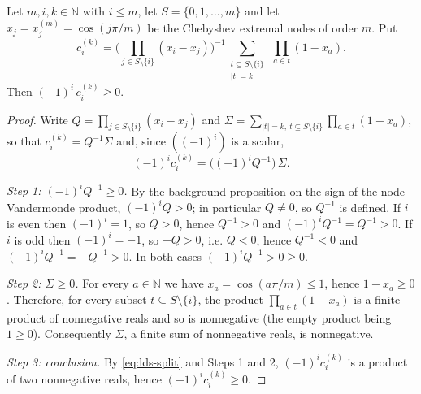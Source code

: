 \begin{lemma}
Let $m,i,k\in\mathbb{N}$ with $i\le m$, let $S=\{0,1,\dots,m\}$ and let
$x_j=x^{(m)}_j=\cos(j\pi/m)$ be the Chebyshev extremal nodes of order $m$. Put
\[
  c_i^{(k)}=\Biggl(\prod_{j\in S\setminus\{i\}}(x_i-x_j)\Biggr)^{-1}
    \sum_{\substack{t\subseteq S\setminus\{i\}\\ \lvert t\rvert=k}}
      \ \prod_{a\in t}(1-x_a).
\]
Then $(-1)^i\,c_i^{(k)}\ge0$.
\end{lemma}
\begin{proof}
Write $Q=\prod_{j\in S\setminus\{i\}}(x_i-x_j)$ and
$\Sigma=\sum_{\lvert t\rvert=k,\ t\subseteq S\setminus\{i\}}\prod_{a\in t}(1-x_a)$,
so that $c_i^{(k)}=Q^{-1}\Sigma$ and, since $((-1)^i)$ is a scalar,
\begin{equation}\label{eq:lds-split}
  (-1)^i c_i^{(k)}=\bigl((-1)^iQ^{-1}\bigr)\,\Sigma .
\end{equation}

\emph{Step 1: $(-1)^iQ^{-1}\ge0$.} By the background proposition on the sign of
the node Vandermonde product, $(-1)^iQ>0$; in particular $Q\ne0$, so $Q^{-1}$ is
defined. If $i$ is even then $(-1)^i=1$, so $Q>0$, hence $Q^{-1}>0$ and
$(-1)^iQ^{-1}=Q^{-1}>0$. If $i$ is odd then $(-1)^i=-1$, so $-Q>0$, i.e. $Q<0$,
hence $Q^{-1}<0$ and $(-1)^iQ^{-1}=-Q^{-1}>0$. In both cases
$(-1)^iQ^{-1}>0\ge0$.

\emph{Step 2: $\Sigma\ge0$.} For every $a\in\mathbb{N}$ we have
$x_a=\cos(a\pi/m)\le1$, hence $1-x_a\ge0$. Therefore, for every subset
$t\subseteq S\setminus\{i\}$, the product $\prod_{a\in t}(1-x_a)$ is a finite
product of nonnegative reals and so is nonnegative (the empty product being
$1\ge0$). Consequently $\Sigma$, a finite sum of nonnegative reals, is
nonnegative.

\emph{Step 3: conclusion.} By \eqref{eq:lds-split} and Steps 1 and 2,
$(-1)^ic_i^{(k)}$ is a product of two nonnegative reals, hence
$(-1)^ic_i^{(k)}\ge0$.
\end{proof}
